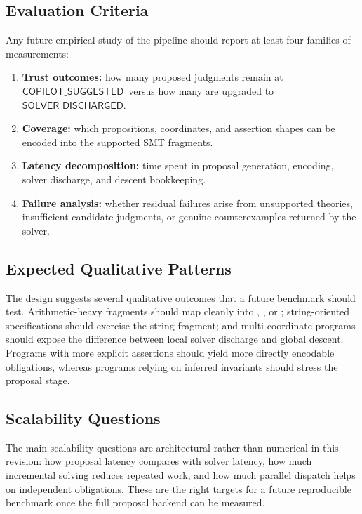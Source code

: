 \documentclass[11pt]{article}
\newcommand{\CopilotSugg}{\ensuremath{\mathsf{COPILOT\_SUGGESTED}}}
\newcommand{\SolverDisch}{\ensuremath{\mathsf{SOLVER\_DISCHARGED}}}
\begin{document}
\subsection{Evaluation Criteria}
Any future empirical study of the pipeline should report at least four
families of measurements:
\begin{enumerate}[noitemsep]
  \item \textbf{Trust outcomes:} how many proposed judgments remain at
        \CopilotSugg\ versus how many are upgraded to \SolverDisch.
  \item \textbf{Coverage:} which propositions, coordinates, and assertion
        shapes can be encoded into the supported SMT fragments.
  \item \textbf{Latency decomposition:} time spent in proposal generation,
        encoding, solver discharge, and descent bookkeeping.
  \item \textbf{Failure analysis:} whether residual failures arise from
        unsupported theories, insufficient candidate judgments, or genuine
        counterexamples returned by the solver.
\end{enumerate}

\subsection{Expected Qualitative Patterns}
The design suggests several qualitative outcomes that a future benchmark
should test.  Arithmetic-heavy fragments should map cleanly into
\QFLIA{}, \QFLRA{}, or \QFBV{}; string-oriented specifications should
exercise the string fragment; and multi-coordinate programs should expose
the difference between local solver discharge and global descent.
Programs with more explicit assertions should yield more directly encodable
obligations, whereas programs relying on inferred invariants should stress
the proposal stage.

\subsection{Scalability Questions}
The main scalability questions are architectural rather than numerical in
this revision: how proposal latency compares with solver latency, how much
incremental solving reduces repeated work, and how much parallel dispatch
helps on independent obligations.  These are the right targets for a
future reproducible benchmark once the full proposal backend can be
measured.

\end{document}
